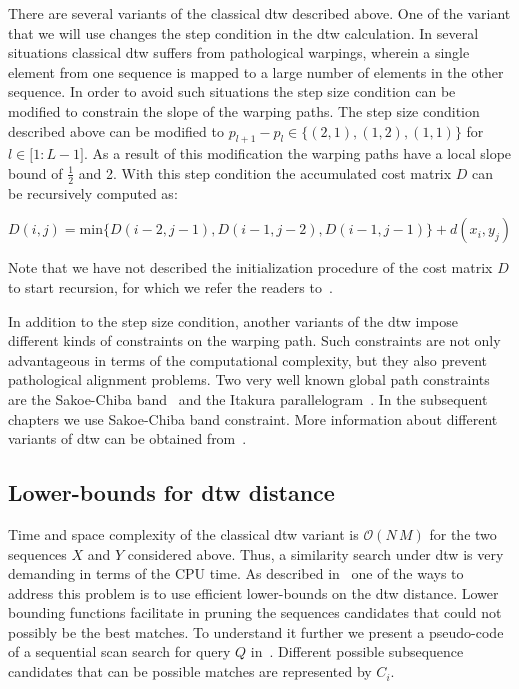 There are several variants of the classical \gls{dtw} described above. One of the variant that we will use changes the step condition in the \gls{dtw} calculation. In several situations classical \gls{dtw} suffers from pathological warpings, wherein a single element from one sequence is mapped to a large number of elements in the other sequence. In order to avoid such situations the step size condition can be modified to constrain the slope of the warping paths. The step size condition described above can be modified to $p_{l+1}-p_l \in \lbrace (2,1), (1,2), (1,1) \rbrace$ for $l \in \lbrack 1: L-1 \rbrack$. As a result of this modification the warping paths have a local slope bound of $\frac{1}{2}$ and 2. With this step condition the accumulated cost matrix $D$ can be recursively computed as:

\begin{equation}
\label{eq:dtw_local_constraint_cost_matrix_computation}
D(i,j) = \mathrm{min} \lbrace D(i-2,j-1), D(i-1,j-2), D(i-1,j-1)\rbrace + d(x_i, y_j)
\end{equation}

Note that we have not described the initialization procedure of the cost matrix $D$ to start recursion, for which we refer the readers to~\cite{muller2007dynamic}.

In addition to the step size condition, another variants of the \gls{dtw} impose different kinds of constraints on the warping path. Such constraints are not only advantageous in terms of the computational complexity, but they also prevent pathological alignment problems. Two very well known global path constraints are the Sakoe-Chiba band~\citep{Sakoe78TASLP} and the Itakura parallelogram~\citep{itakura1975minimum}. In the subsequent chapters we use Sakoe-Chiba band constraint. More information about different variants of \gls{dtw} can be obtained from~\citep{rabiner1993fundamentals,muller2007dynamic}.

\subsection{Lower-bounds for \acrshort{dtw} distance}
\label{sec:background_lowerbound}

Time and space complexity of the classical \gls{dtw} variant is $\mathcal{O}(N\,M)$ for the two sequences $X$ and $Y$ considered above. Thus, a similarity search under \gls{dtw} is very demanding in terms of the CPU time. As described in~\cite{Keogh2004} one of the ways to address this problem is to use efficient lower-bounds on the \gls{dtw} distance. Lower bounding functions facilitate in pruning the sequences candidates that could not possibly be the best matches. To understand it further we present a pseudo-code of a sequential scan search for query $Q$ in~. Different possible subsequence candidates that can be possible matches are represented by $C_i$.%

